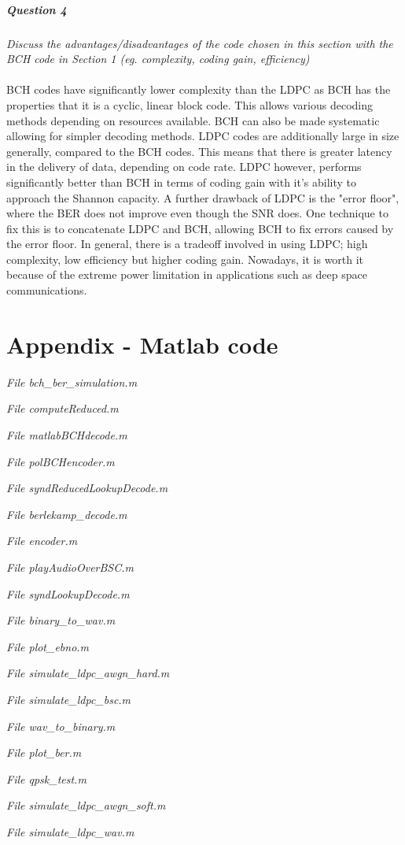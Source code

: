 \documentclass[a4paper]{article}
\begin{document}
\subsubsection{Question 4} \textit{Discuss the advantages/disadvantages of the code chosen in this section with the BCH code in Section 1 (eg. complexity, coding gain, efficiency)}\\
\\
BCH codes have significantly lower complexity than the LDPC as BCH has the properties that it is a cyclic, linear block code. This allows various decoding methods depending on resources available. BCH can also be made systematic allowing for simpler decoding methods. LDPC codes are additionally large in size generally, compared to the BCH codes. This means that there is greater latency in the delivery of data, depending on code rate. LDPC however, performs significantly better than BCH in terms of coding gain with it's ability to approach the Shannon capacity. A further drawback of LDPC is the "error floor", where the BER does not improve even though the SNR does. One technique to fix this is to concatenate LDPC and BCH, allowing BCH to fix errors caused by the error floor. In general, there is a tradeoff involved in using LDPC; high complexity, low efficiency but higher coding gain. Nowadays, it is worth it because of the extreme power limitation in applications such as deep space communications.




\hfill
\newpage

\part*{Appendix - Matlab code}

\textit{File bch\_ber\_simulation.m} 

\textit{File computeReduced.m} 
 
\textit{File matlabBCHdecode.m} 
 
\textit{File polBCHencoder.m} 
 
\textit{File syndReducedLookupDecode.m} 

\textit{File berlekamp\_decode.m} 
 
\textit{File encoder.m} 
 
\textit{File playAudioOverBSC.m} 
 
\textit{File syndLookupDecode.m} 

\textit{File binary\_to\_wav.m} 

\textit{File plot\_ebno.m } 
 
\textit{File simulate\_ldpc\_awgn\_hard.m} 
 
\textit{File simulate\_ldpc\_bsc.m} 
 
\textit{File wav\_to\_binary.m} 

\textit{File plot\_ber.m } 
 
\textit{File qpsk\_test.m} 
 
\textit{File simulate\_ldpc\_awgn\_soft.m } 
 
\textit{File simulate\_ldpc\_wav.m} 

\end{document}
